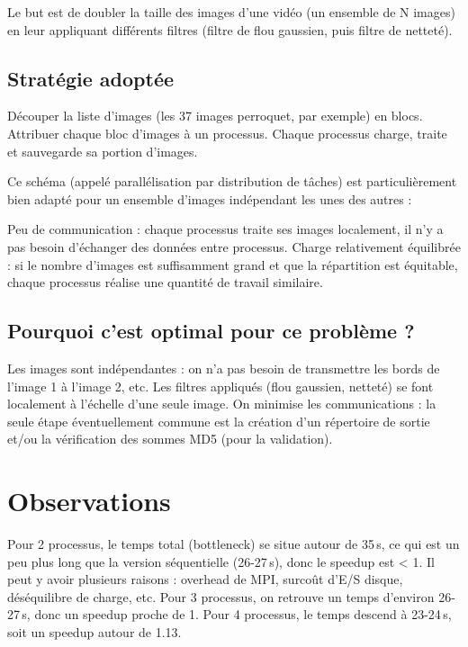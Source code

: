 \documentclass[a4paper,13pt]{book}
\begin{document}
Le but est de doubler la taille des images d’une vidéo (un ensemble de N images) en leur appliquant différents filtres (filtre de flou gaussien, puis filtre de netteté).

\subsection{Stratégie adoptée}

    Découper la liste d’images (les 37 images perroquet, par exemple) en blocs.
    Attribuer chaque bloc d’images à un processus.
    Chaque processus charge, traite et sauvegarde sa portion d’images.

Ce schéma (appelé parallélisation par distribution de tâches) est particulièrement bien adapté pour un ensemble d’images indépendant les unes des autres :

    Peu de communication : chaque processus traite ses images localement, il n’y a pas besoin d’échanger des données entre processus.
    Charge relativement équilibrée : si le nombre d’images est suffisamment grand et que la répartition est équitable, chaque processus réalise une quantité de travail similaire.

\subsection{Pourquoi c’est optimal pour ce problème ?}

    Les images sont indépendantes : on n’a pas besoin de transmettre les bords de l’image 1 à l’image 2, etc.
    Les filtres appliqués (flou gaussien, netteté) se font localement à l’échelle d’une seule image.
    On minimise les communications : la seule étape éventuellement commune est la création d’un répertoire de sortie et/ou la vérification des sommes MD5 (pour la validation).

\section{Observations}

    Pour 2 processus, le temps total (bottleneck) se situe autour de 35 s, ce qui est un peu plus long que la version séquentielle (26-27 s), donc le speedup est < 1.
        Il peut y avoir plusieurs raisons : overhead de MPI, surcoût d’E/S disque, déséquilibre de charge, etc.
    Pour 3 processus, on retrouve un temps d’environ 26-27 s, donc un speedup proche de 1.
    Pour 4 processus, le temps descend à 23-24 s, soit un speedup autour de 1.13.
\end{document}
